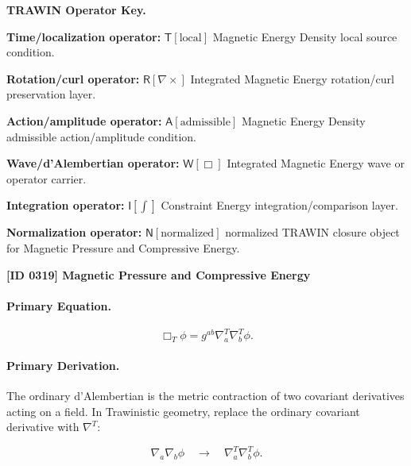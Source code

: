 \par\vspace{0.45\baselineskip}
\noindent\begin{minipage}[t]{\linewidth}
\begingroup
\small
\raggedright
\textbf{TRAWIN Operator Key.}\par
\noindent\textbf{Time/localization operator:} $\mathsf{T}\!\left[\mathrm{local}\right]$ Magnetic Energy Density local source condition.\par
\noindent\textbf{Rotation/curl operator:} $\mathsf{R}\!\left[\nabla\times\right]$ Integrated Magnetic Energy rotation/curl preservation layer.\par
\noindent\textbf{Action/amplitude operator:} $\mathsf{A}\!\left[\mathrm{admissible}\right]$ Magnetic Energy Density admissible action/amplitude condition.\par
\noindent\textbf{Wave/d'Alembertian operator:} $\mathsf{W}\!\left[\Box\right]$ Integrated Magnetic Energy wave or operator carrier.\par
\noindent\textbf{Integration operator:} $\mathsf{I}\!\left[\int\right]$ Constraint Energy integration/comparison layer.\par
\noindent\textbf{Normalization operator:} $\mathsf{N}\!\left[\mathrm{normalized}\right]$ normalized TRAWIN closure object for Magnetic Pressure and Compressive Energy.\par
\endgroup
\end{minipage}

\clearpage
\noindent\textbf{[ID 0319] Magnetic Pressure and Compressive Energy}\par
\vspace{0.35em}
\paragraph{Primary Equation.}
\begin{equation}
\Box_T\phi
=
g^{ab}
\nabla^{T}_{a}
\nabla^{T}_{b}
\phi .
\end{equation}

\paragraph{Primary Derivation.}
The ordinary d'Alembertian is the metric contraction of two covariant derivatives acting on a field.  
In Trawinistic geometry, replace the ordinary covariant derivative with $\nabla^T$:

\begin{equation}
\nabla_a\nabla_b\phi
\quad\longrightarrow\quad
\nabla^T_a\nabla^T_b\phi .
\end{equation}

